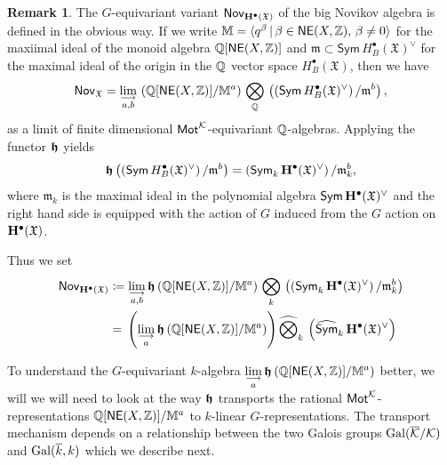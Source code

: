 \documentclass[twoside,leqno]{article}
\numberwithin{equation}{section}
\theoremstyle{plain}
\theoremstyle{definition}
\newtheorem{remark}[equation]{Remark}
\begin{document}
\begin{remark}
The $G$-equivariant variant
      $\mathsf{Nov}_{\mathbf{H}^{\bullet}(\mathfrak{X})}$ of the big Novikov
      algebra is defined in the obvious way. If we write $\mathbb{M} =
      \langle q^{\beta} \, | \, \beta \in \mathsf{NE}(X,\mathbb Z), \,
      \beta \neq 0 \rangle$ for the maxiimal ideal of the monoid
      algebra $\mathbb Q[\mathsf{NE}(X,\mathbb Z)]$ and $\mathfrak{m} \subset
      \mathsf{Sym} \, H^{\bullet}_{B}(\mathfrak{X})^{\vee}$ for the
      maximal ideal of the origin in the $\mathbb Q$ vector space
      $H^{\bullet}_{B}(\mathfrak{X})$, then we have
      \[
      \mathsf{Nov}_{\mathfrak{X}} = \lim_{\substack{\longrightarrow \\ a,b}} \,
      \left(\mathbb Q[\mathsf{NE}(X,\mathbb Z)]/\mathbb{M}^{a}\right) \,
      \bigotimes_{\mathbb Q} \, \left( \left(\mathsf{Sym} \,
      H^{\bullet}_{B}(\mathfrak{X})^{\vee}\right)/\mathfrak{m}^{b}\right),
      \]
 as a limit of finite dimensional $\mathsf{Mot}^{\mathcal K}$-equivariant
 $\mathbb Q$-algebras.
 Applying the functor $\boldsymbol{\mathfrak{h}}$ yields
 \[
 \boldsymbol{\mathfrak{h}}\left( \left(\mathsf{Sym} \,
 H^{\bullet}_{B}(\mathfrak{X})^{\vee}\right)/\mathfrak{m}^{b}\right) =
 \left(\mathsf{Sym}_{k} \,
 \mathbf{H}^{\bullet}(\mathfrak{X})^{\vee}\right)/\mathfrak{m}_{k}^{b},
 \]
 where $\mathfrak{m}_{k}$ is the maximal ideal in the polynomial
 algebra $\mathsf{Sym} \, \mathbf{H}^{\bullet}(\mathfrak{X})^{\vee}$ and the
 right hand side is equipped with the action of $G$ induced from the
 $G$ action on $\mathbf{H}^{\bullet}(\mathfrak{X})$.

 Thus we set
 \[
 \begin{aligned}
 \mathsf{Nov}_{\mathbf{H}^{\bullet}(\mathfrak{X})} & \coloneqq\lim_{\substack{\longrightarrow \\ a,b}}
 \boldsymbol{\mathfrak{h}} \left(\mathbb Q[\mathsf{NE}(X,\mathbb Z)]/\mathbb{M}^{a}\right) \,
 \bigotimes_{k} \,
 \left(\left(\mathsf{Sym}_{k} \,
 \mathbf{H}^{\bullet}(\mathfrak{X})^{\vee}\right)/\mathfrak{m}_{k}^{b}\right)  \\
 & = \, \left( \lim_{\substack{\longrightarrow \\ a  }}
 \boldsymbol{\mathfrak{h}} \left(\mathbb Q[\mathsf{NE}(X,\mathbb Z)]/\mathbb{M}^{a}\right)\right)
 \widehat{\bigotimes}_{k} \, \left(\widehat{\mathsf{Sym}}_{k} \,
 \mathbf{H}^{\bullet}(\mathfrak{X})^{\vee}\right)
 \end{aligned}
 \]

To understand the $G$-equivariant $k$-algebra
${\displaystyle \lim_{\substack{\longrightarrow \\ a}} \boldsymbol{\mathfrak{h}}
  \left(\mathbb Q[\mathsf{NE}(X,\mathbb Z)]/\mathbb{M}^{a}\right)}$ better, we
will we will need to look at the way $\boldsymbol{\mathfrak{h}}$ transports the rational
$\mathsf{Mot}^{\mathcal K}$-representations
$\mathbb Q[\mathsf{NE}(X,\mathbb Z)]/\mathbb{M}^{a}$ to $k$-linear
$G$-representations. The transport mechanism depends on a relationship
between the two Galois groups $\operatorname{Gal}(\overline{\mathcal K}/\mathcal K)$ and $\operatorname{Gal}(\overline{k},k)$
which we describe next.
\end{remark}
\end{document}
